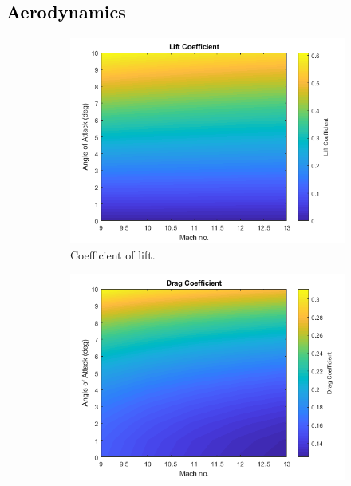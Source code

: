 \textcolor{black}{
		\subsection{Aerodynamics}\label{sec:thirdstageaero}
	}
			\begin{figure}[!ht]
				\begin{subfigure}{.5\textwidth}
					\centering
					\includegraphics[width=0.99\linewidth]{figures/3_vehicle_design/ThirdStageCl}
					\caption{Coefficient of lift.}
					\label{fig:Cl-ThirdStage}
				\end{subfigure}
				\begin{subfigure}{.5\textwidth}
					\centering
					\includegraphics[width=0.99\linewidth]{figures/3_vehicle_design/ThirdStageCd}

\end{subfigure}
\end{figure}
